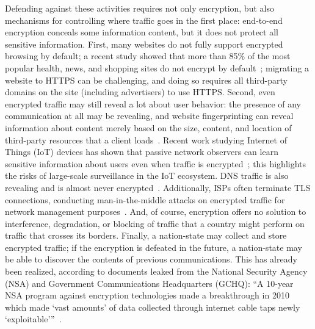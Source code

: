Defending against these activities requires not only encryption, but
also mechanisms for controlling where traffic goes in the first place:
end-to-end 
encryption conceals some information content, but it does not protect
all sensitive information.  First, many websites do not fully support
encrypted browsing by default; a recent study showed that more than 85\% of
the most popular health, news, and shopping sites do not encrypt by
default~\cite{what_isps_can_see}; migrating a website to HTTPS can be challenging,
and doing so requires all third-party domains on the site (including
advertisers) to use HTTPS.  Second, even encrypted traffic may still reveal a
lot about user behavior: the presence of any communication at all may be
revealing, and website fingerprinting can reveal information about content
merely based on the size, content, and location of third-party resources that
a client loads~\cite{Johnson2013a}. Recent work studying Internet of Things (IoT) devices 
has shown that passive network observers can learn sensitive information about users 
even when traffic is encrypted~\cite{apthorpe2016poster}; this highlights the risks of large-scale surveillance 
in the IoT ecosystem. DNS traffic is also revealing and is
almost never encrypted~\cite{what_isps_can_see}.  Additionally, ISPs often
terminate TLS connections, conducting man-in-the-middle attacks on encrypted
traffic for network management purposes~\cite{mitm_isp}.  And, of course,
encryption offers no solution to interference, degradation, or blocking of
traffic that a country might perform on traffic that crosses its borders.
Finally, a nation-state may collect and store encrypted traffic; if the
encryption is defeated in the future, a nation-state may be able to discover the
contents of previous communications.  This has already been realized, according to 
documents leaked from the National Security Agency (NSA) and Government Communications 
Headquarters (GCHQ): ``A 10-year NSA program against encryption technologies made a breakthrough in 2010 which made `vast amounts' of data collected through internet cable taps newly `exploitable'''~\cite{encryption_forward}.

